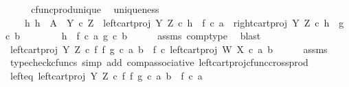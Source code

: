 \begin{isabellebody}
%
\isadelimproof
%
\endisadelimproof
%
\isatagproof
{}\isamarkupfalse%
\ {\isacharminus}{\kern0pt}\isanewline
\ \ \isamarkupfalse%
\ cfunc{\isacharunderscore}{\kern0pt}prod{\isacharunderscore}{\kern0pt}unique\ \isamarkupfalse%
\ uniqueness{\isacharcolon}{\kern0pt}\isanewline
\ \ \ \ {\isachardoublequoteopen}{\isasymforall}h{\isachardot}{\kern0pt}\ h\ {\isacharcolon}{\kern0pt}\ A\ {\isasymrightarrow}\ Y\ {\isasymtimes}\isactrlsub c\ Z\ {\isasymand}\ left{\isacharunderscore}{\kern0pt}cart{\isacharunderscore}{\kern0pt}proj\ Y\ Z\ {\isasymcirc}\isactrlsub c\ h\ {\isacharequal}{\kern0pt}\ f\ {\isasymcirc}\isactrlsub c\ a\ {\isasymand}\ right{\isacharunderscore}{\kern0pt}cart{\isacharunderscore}{\kern0pt}proj\ Y\ Z\ {\isasymcirc}\isactrlsub c\ h\ {\isacharequal}{\kern0pt}\ g\ {\isasymcirc}\isactrlsub c\ b\ {\isasymlongrightarrow}\ \isanewline
\ \ \ \ \ \ h\ {\isacharequal}{\kern0pt}\ {\isasymlangle}f\ {\isasymcirc}\isactrlsub c\ a{\isacharcomma}{\kern0pt}\ g\ {\isasymcirc}\isactrlsub c\ b{\isasymrangle}{\isachardoublequoteclose}\isanewline
\ \ \ \ \isamarkupfalse%
\ assms\ comp{\isacharunderscore}{\kern0pt}type\ \isamarkupfalse%
\ blast\isanewline
\isanewline
\ \ \isamarkupfalse%
\ {\isachardoublequoteopen}left{\isacharunderscore}{\kern0pt}cart{\isacharunderscore}{\kern0pt}proj\ Y\ Z\ {\isasymcirc}\isactrlsub c\ {\isacharparenleft}{\kern0pt}f\ {\isasymtimes}\isactrlsub f\ g{\isacharparenright}{\kern0pt}\ {\isasymcirc}\isactrlsub c\ {\isasymlangle}a{\isacharcomma}{\kern0pt}\ b{\isasymrangle}\ {\isacharequal}{\kern0pt}\ f\ {\isasymcirc}\isactrlsub c\ left{\isacharunderscore}{\kern0pt}cart{\isacharunderscore}{\kern0pt}proj\ W\ X\ {\isasymcirc}\isactrlsub c\ {\isasymlangle}a{\isacharcomma}{\kern0pt}\ b{\isasymrangle}{\isachardoublequoteclose}\isanewline
\ \ \ \ \isamarkupfalse%
\ assms\ \isamarkupfalse%
\ {\isacharparenleft}{\kern0pt}typecheck{\isacharunderscore}{\kern0pt}cfuncs{\isacharcomma}{\kern0pt}\ simp\ add{\isacharcolon}{\kern0pt}\ comp{\isacharunderscore}{\kern0pt}associative{}\ left{\isacharunderscore}{\kern0pt}cart{\isacharunderscore}{\kern0pt}proj{\isacharunderscore}{\kern0pt}cfunc{\isacharunderscore}{\kern0pt}cross{\isacharunderscore}{\kern0pt}prod{\isacharparenright}{\kern0pt}\isanewline
\ \ \isamarkupfalse%
\ \isamarkupfalse%
\ left{\isacharunderscore}{\kern0pt}eq{\isacharcolon}{\kern0pt}\ {\isachardoublequoteopen}left{\isacharunderscore}{\kern0pt}cart{\isacharunderscore}{\kern0pt}proj\ Y\ Z\ {\isasymcirc}\isactrlsub c\ {\isacharparenleft}{\kern0pt}f\ {\isasymtimes}\isactrlsub f\ g{\isacharparenright}{\kern0pt}\ {\isasymcirc}\isactrlsub c\ {\isasymlangle}a{\isacharcomma}{\kern0pt}\ b{\isasymrangle}\ {\isacharequal}{\kern0pt}\ f\ {\isasymcirc}\isactrlsub c\ a{\isachardoublequoteclose}\isanewline

\end{isabellebody}
